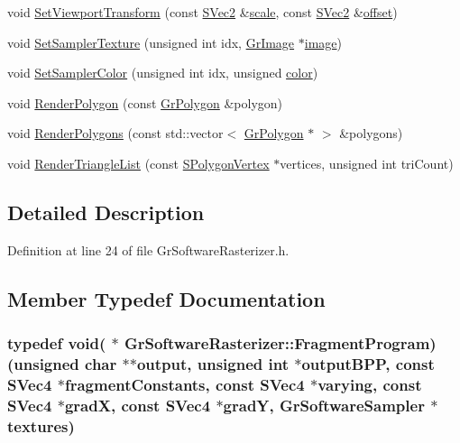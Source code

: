 \begin{CompactItemize}
\begin{CompactItemize}
\item 
void \hyperlink{class_gr_software_rasterizer_bd64403e6d390fcc8b1c1b24ccdbd2e3}{SetViewportTransform} (const \hyperlink{struct_s_vec2}{SVec2} \&\hyperlink{glext__bak_8h_281421b881aa7a1266842b73a3bc7655}{scale}, const \hyperlink{struct_s_vec2}{SVec2} \&\hyperlink{glext__bak_8h_a782f3aea23e3c30029c811241dc2c82}{offset})
\item 
void \hyperlink{class_gr_software_rasterizer_51810eee95ddc746a8a9021773ff6c1b}{SetSamplerTexture} (unsigned int idx, \hyperlink{class_gr_image}{GrImage} $\ast$\hyperlink{glext__bak_8h_8943555672bc4b8056204eb92329cafa}{image})
\item 
void \hyperlink{class_gr_software_rasterizer_e7b4972331ce39e47a82e4c9c19b584f}{SetSamplerColor} (unsigned int idx, unsigned \hyperlink{glext_8h_3ea846f998d64f079b86052b6c4193a8}{color})
\item 
void \hyperlink{class_gr_software_rasterizer_af148346dfc9a809ba804df800965bfa}{RenderPolygon} (const \hyperlink{class_gr_polygon}{GrPolygon} \&polygon)
\item 
void \hyperlink{class_gr_software_rasterizer_51c764b2c87c4bce658c9e57d772fb12}{RenderPolygons} (const std::vector$<$ \hyperlink{class_gr_polygon}{GrPolygon} $\ast$ $>$ \&polygons)
\item 
void \hyperlink{class_gr_software_rasterizer_88d35958cb87737f1d82a14ef513b10a}{RenderTriangleList} (const \hyperlink{struct_s_polygon_vertex}{SPolygonVertex} $\ast$vertices, unsigned int triCount)
\end{CompactItemize}


\subsection{Detailed Description}


Definition at line 24 of file GrSoftwareRasterizer.h.

\subsection{Member Typedef Documentation}
\hypertarget{class_gr_software_rasterizer_391d569a4a93dabc37cdc787f11c2e9a}{
\subsubsection[{FragmentProgram}]{\setlength{\rightskip}{0pt plus 5cm}typedef void( $\ast$ {\bf GrSoftwareRasterizer::FragmentProgram})(unsigned char $\ast$$\ast$output, unsigned int $\ast$outputBPP, const {\bf SVec4} $\ast$fragmentConstants, const {\bf SVec4} $\ast$varying, const {\bf SVec4} $\ast$gradX, const {\bf SVec4} $\ast$gradY, {\bf GrSoftwareSampler} $\ast${\bf textures})}}
\label{class_gr_software_rasterizer_391d569a4a93dabc37cdc787f11c2e9a}



\end{CompactItemize}
